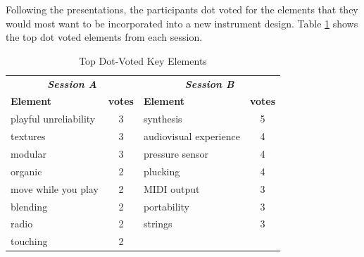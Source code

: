 \documentclass[letterpaper, 12pt]{article}
\begin{document}

Following the presentations, the participants dot voted for the elements that they would most want to be incorporated into a new instrument design. Table \ref{ch3-tab:dot-voting} shows the top dot voted elements from each session. 

\begin{table}[htbp]
    \centering
    \caption{Top Dot-Voted Key Elements}
    \begin{tabular}{lc|lc}
        \hline
        \multicolumn{2}{c|}{\textbf{\emph{Session A}}} &
        \multicolumn{2}{c}{\textbf{\emph{Session B}}} \\
        \textbf{Element} & \textbf{votes} &
        \textbf{Element} & \textbf{votes} \\
        \hline
        playful unreliability & 3 & synthesis & 5 \\
        textures & 3 & audiovisual experience & 4 \\
        modular & 3 & pressure sensor & 4 \\
        organic & 2 & plucking & 4 \\
        move while you play & 2 & MIDI output & 3 \\
        blending & 2 & portability & 3 \\
        radio & 2 & strings & 3 \\
        touching & 2 & & \\
        \hline
    \end{tabular}
    \label{ch3-tab:dot-voting}
    
\end{table}

\end{document}
